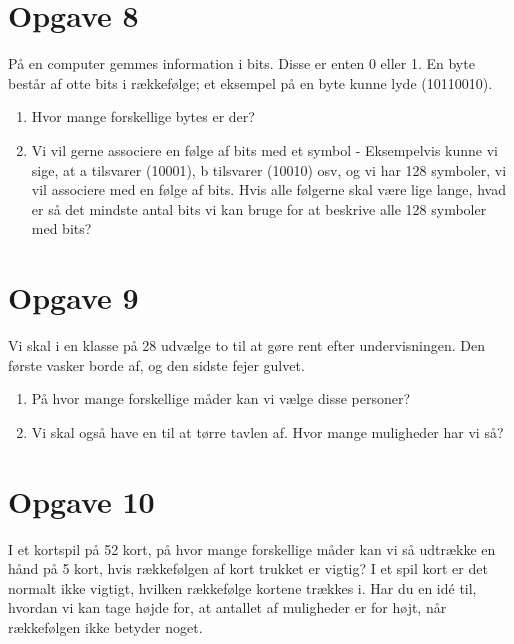 \section*{Opgave 8}
På en computer gemmes information i bits. Disse er enten 0 eller 1. En byte består af otte bits i rækkefølge; et eksempel på en byte kunne lyde (10110010).
\begin{enumerate}[label=\roman*)]
\item Hvor mange forskellige bytes er der?
\item Vi vil gerne associere en følge af bits med et symbol - Eksempelvis kunne vi sige, at a tilsvarer (10001), b tilsvarer (10010) osv, og vi har 128 symboler, vi vil associere med en følge af bits. Hvis alle følgerne skal være lige lange, hvad er så det mindste antal bits vi kan bruge for at beskrive alle 128 symboler med bits?
\end{enumerate}
\section*{Opgave 9}
Vi skal i en klasse på 28 udvælge to til at gøre rent efter undervisningen. Den første vasker borde af, og den sidste fejer gulvet. 
\begin{enumerate}[label=\roman*)]

\item På hvor mange forskellige måder kan vi vælge disse personer?
\item Vi skal også have en til at tørre tavlen af. Hvor mange muligheder har vi så?

\end{enumerate}
\section*{Opgave 10}
I et kortspil på 52 kort, på hvor mange forskellige måder kan vi så udtrække en hånd på 5 kort, hvis rækkefølgen af kort trukket er vigtig? I et spil kort er det normalt ikke vigtigt, hvilken rækkefølge kortene trækkes i. Har du en idé til, hvordan vi kan tage højde for, at antallet af muligheder er for højt, når rækkefølgen ikke betyder noget. 
